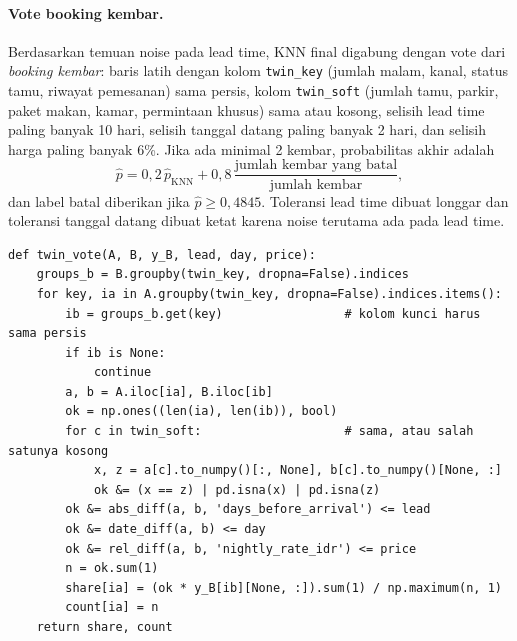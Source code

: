 \paragraph{Vote booking kembar.} Berdasarkan temuan noise pada lead time, KNN final digabung dengan vote dari \emph{booking kembar}: baris latih dengan kolom \texttt{twin\_key} (jumlah malam, kanal, status tamu, riwayat pemesanan) sama persis, kolom \texttt{twin\_soft} (jumlah tamu, parkir, paket makan, kamar, permintaan khusus) sama atau kosong, selisih lead time paling banyak 10 hari, selisih tanggal datang paling banyak 2 hari, dan selisih harga paling banyak 6\%. Jika ada minimal 2 kembar, probabilitas akhir adalah
\begin{equation}
  \hat{p} = 0{,}2\,\hat{p}_{\text{KNN}} + 0{,}8\,\frac{\text{jumlah kembar yang batal}}{\text{jumlah kembar}},
\end{equation}
dan label batal diberikan jika $\hat{p}\ge0{,}4845$. Toleransi lead time dibuat longgar dan toleransi tanggal datang dibuat ketat karena noise terutama ada pada lead time.

\begin{lstlisting}[caption={Vote booking kembar (diringkas)}, label={lst:twin}]
def twin_vote(A, B, y_B, lead, day, price):
    groups_b = B.groupby(twin_key, dropna=False).indices
    for key, ia in A.groupby(twin_key, dropna=False).indices.items():
        ib = groups_b.get(key)                 # kolom kunci harus sama persis
        if ib is None:
            continue
        a, b = A.iloc[ia], B.iloc[ib]
        ok = np.ones((len(ia), len(ib)), bool)
        for c in twin_soft:                    # sama, atau salah satunya kosong
            x, z = a[c].to_numpy()[:, None], b[c].to_numpy()[None, :]
            ok &= (x == z) | pd.isna(x) | pd.isna(z)
        ok &= abs_diff(a, b, 'days_before_arrival') <= lead
        ok &= date_diff(a, b) <= day
        ok &= rel_diff(a, b, 'nightly_rate_idr') <= price
        n = ok.sum(1)
        share[ia] = (ok * y_B[ib][None, :]).sum(1) / np.maximum(n, 1)
        count[ia] = n
    return share, count
\end{lstlisting}

